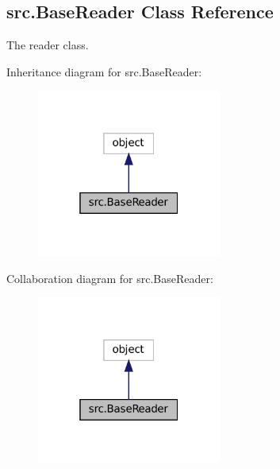 \hypertarget{classsrc_1_1BaseReader}{}\subsection{src.\+Base\+Reader Class Reference}
\label{classsrc_1_1BaseReader}


The \textquotesingle{}reader\textquotesingle{} class.  




Inheritance diagram for src.\+Base\+Reader\+:
\nopagebreak
\begin{figure}[H]
\begin{center}
\leavevmode
\includegraphics[width=172pt]{classsrc_1_1BaseReader__inherit__graph}
\end{center}
\end{figure}


Collaboration diagram for src.\+Base\+Reader\+:
\nopagebreak
\begin{figure}[H]
\begin{center}
\leavevmode
\includegraphics[width=172pt]{classsrc_1_1BaseReader__coll__graph}
\end{center}
\end{figure}
